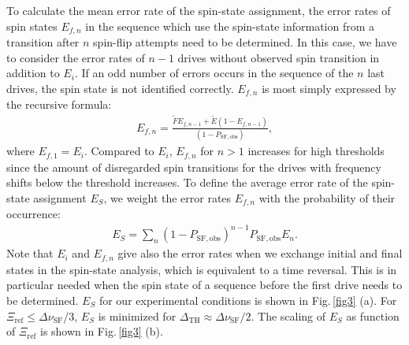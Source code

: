 \documentclass[12pt,preprint%
]{elsarticle}
\begin{document}
To calculate the mean error rate of the spin-state assignment, the error rates of spin states $E_{f,n}$ in the sequence which use the spin-state information from a transition after $n$ spin-flip attempts need to be determined. In this case, we have to consider the error rates of $n-1$ drives without observed spin transition in addition to $E_{i}$. If an odd number of errors occurs in the sequence of the $n$ last drives, the spin state is not identified correctly. $E_{f,n}$ is most simply expressed by the recursive formula:
\begin{eqnarray}
E_{f,n} = \frac{\tilde{F} E_{f,n-1} + \tilde{E} (1-E_{f,n-1})}{(1- P_{\mathrm{SF,obs}})},
\end{eqnarray}
where $E_{f,1}=E_{i}$. Compared to $E_{i}$, $E_{f,n}$ for $n>1$ increases for high thresholds since the amount of disregarded spin transitions for the drives with frequency shifts below the threshold increases. To define the average error rate of the spin-state assignment $E_S$, we weight the error rates $E_{f,n}$ with the probability of their occurrence:
\begin{eqnarray}
E_S = \sum_n (1 - P_{\mathrm{SF,obs}})^{n-1} P_{\mathrm{SF,obs}} E_n.
\end{eqnarray}
Note that $E_i$ and $E_{f,n}$ give also the error rates when we exchange initial and final states in the spin-state analysis, which is equivalent to a time reversal. This is in particular needed when the spin state of a sequence before the first drive needs to be determined. $E_S$ for our experimental conditions is shown in Fig.$\,$\ref{fig3} (a). For $\Xi_{\mathrm{ref}} \leq \Delta\nu_{\mathrm{SF}}$/3, $E_S$ is minimized for $\Delta_{\mathrm{TH}} \approx \Delta\nu_\mathrm{SF}/2$. The scaling of $E_S$ as function of $\Xi_{\mathrm{ref}}$ is shown in Fig.$\,$\ref{fig3} (b).
\end{document}
